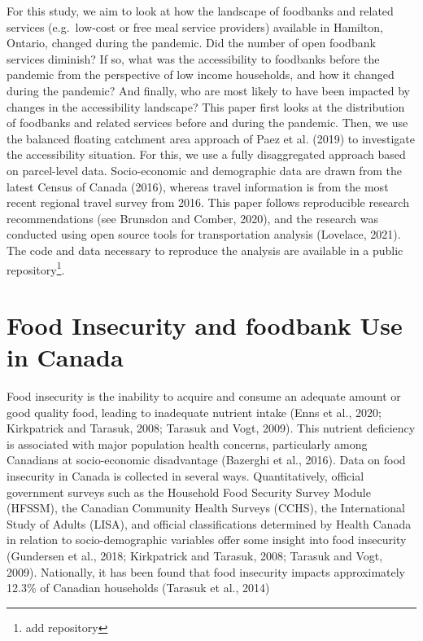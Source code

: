 \documentclass[]{elsarticle} %
\begin{document}
For this study, we aim to look at how the landscape of foodbanks and
related services (e.g.~low-cost or free meal service providers)
available in Hamilton, Ontario, changed during the pandemic. Did the
number of open foodbank services diminish? If so, what was the
accessibility to foodbanks before the pandemic from the perspective of
low income households, and how it changed during the pandemic? And
finally, who are most likely to have been impacted by changes in the
accessibility landscape? This paper first looks at the distribution of
foodbanks and related services before and during the pandemic. Then, we
use the balanced floating catchment area approach of Paez et al. (2019)
to investigate the accessibility situation. For this, we use a fully
disaggregated approach based on parcel-level data. Socio-economic and
demographic data are drawn from the latest Census of Canada (2016),
whereas travel information is from the most recent regional travel
survey from 2016. This paper follows reproducible research
recommendations (see Brunsdon and Comber, 2020), and the research was
conducted using open source tools for transportation analysis (Lovelace,
2021). The code and data necessary to reproduce the analysis are
available in a public repository\footnote{add repository}.

\hypertarget{food-insecurity-and-foodbank-use-in-canada}{%
\section{Food Insecurity and foodbank Use in
Canada}\label{food-insecurity-and-foodbank-use-in-canada}}

Food insecurity is the inability to acquire and consume an adequate
amount or good quality food, leading to inadequate nutrient intake (Enns
et al., 2020; Kirkpatrick and Tarasuk, 2008; Tarasuk and Vogt, 2009).
This nutrient deficiency is associated with major population health
concerns, particularly among Canadians at socio-economic disadvantage
(Bazerghi et al., 2016). Data on food insecurity in Canada is collected
in several ways. Quantitatively, official government surveys such as the
Household Food Security Survey Module (HFSSM), the Canadian Community
Health Surveys (CCHS), the International Study of Adults (LISA), and
official classifications determined by Health Canada in relation to
socio-demographic variables offer some insight into food insecurity
(Gundersen et al., 2018; Kirkpatrick and Tarasuk, 2008; Tarasuk and
Vogt, 2009). Nationally, it has been found that food insecurity impacts
approximately 12.3\% of Canadian households (Tarasuk et al., 2014)
\end{document}
